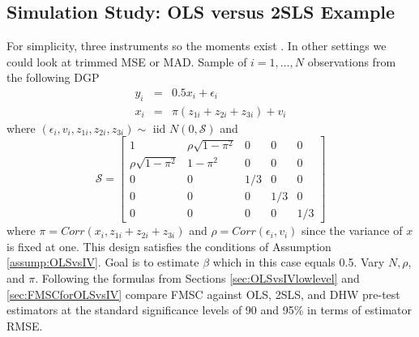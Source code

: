 \subsection{Simulation Study: OLS versus 2SLS Example}
For simplicity, three instruments so the moments exist \citep{Phillips1980}. 
In other settings we could look at trimmed MSE or MAD.
Sample of $i = 1, \hdots, N$ observations from the following DGP 
\begin{eqnarray}
	y_i &=& 0.5 x_i + \epsilon_i\\
	x_i &=& \pi(z_{1i} + z_{2i} + z_{3i}) + v_i
\end{eqnarray}
where $(\epsilon_i, v_i, z_{1i}, z_{2i}, z_{3i}) \sim \mbox{ iid } N(0, \mathcal{S})$ and
\begin{equation}
	\mathcal{S} = \left[ \begin{array}
		{ccccc} 
		1 & \rho \sqrt{1-\pi^2}& 0 & 0 & 0\\
		\rho\sqrt{1-\pi^2} & 1 - \pi^2 & 0 & 0 & 0\\
		0 & 0 & 1/3 & 0 & 0\\
		0 & 0 & 0 & 1/3 & 0 \\
		0 & 0 & 0 & 0 & 1/3
	\end{array}\right]
\end{equation}
where $\pi = Corr(x_i, z_{1i} + z_{2i} + z_{3i})$ and $\rho = Corr(\epsilon_i, v_i)$ since the variance of $x$ is fixed at one.
This design satisfies the conditions of Assumption \ref{assump:OLSvsIV}.
Goal is to estimate $\beta$ which in this case equals 0.5.
Vary $N, \rho$, and $\pi$.
Following the formulas from Sections \ref{sec:OLSvsIVlowlevel} and \ref{sec:FMSCforOLSvsIV} compare FMSC against OLS, 2SLS, and DHW pre-test estimators at the standard significance levels of 90 and 95\% in terms of estimator RMSE.